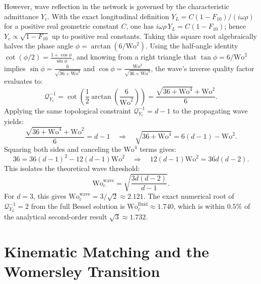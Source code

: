 \documentclass[11pt,a4paper]{article}
\theoremstyle{remark}
\begin{document}
However, wave reflection in the network is governed by the characteristic
admittance $Y_c$. With the exact longitudinal definition $Y_L =
C(1-F_{10})/(i\omega\rho)$ for a positive real geometric constant $C$, one has
$i\omega\rho\,Y_L = C(1-F_{10})$; hence $Y_c\propto\sqrt{1-F_{10}}$ up to
positive real constants. Taking this square root algebraically halves the phase
angle $\phi = \arctan(6/\mathrm{Wo}^2)$. Using the half-angle identity
$\cot(\phi/2) = \frac{1+\cos\phi}{\sin\phi}$, and knowing from a right triangle
that $\tan\phi = 6/\mathrm{Wo}^2$ implies $\sin\phi =
\frac{6}{\sqrt{36+\mathrm{Wo}^4}}$ and $\cos\phi =
\frac{\mathrm{Wo}^2}{\sqrt{36+\mathrm{Wo}^4}}$, the wave's inverse quality
factor evaluates to:
\begin{equation}
    \mathcal{Q}^{-1}_{Y_c} = \cot\left(\frac{1}{2}\arctan\left(\frac{6}{\mathrm{Wo}^2}\right)\right) = \frac{\sqrt{36 + \mathrm{Wo}^4} + \mathrm{Wo}^2}{6}.
\end{equation}
Applying the same topological constraint $\mathcal{Q}^{-1}_{Y_c} = d - 1$ to the
propagating wave yields:
\begin{equation}
    \frac{\sqrt{36+\mathrm{Wo}^4}+\mathrm{Wo}^2}{6} = d - 1 \quad\Rightarrow\quad \sqrt{36+\mathrm{Wo}^4} = 6(d-1) - \mathrm{Wo}^2.
\end{equation}
Squaring both sides and canceling the $\mathrm{Wo}^4$ terms gives:
\begin{equation}
    36 = 36(d-1)^2 - 12(d-1)\mathrm{Wo}^2 \quad\Rightarrow\quad 12(d-1)\mathrm{Wo}^2 = 36d(d-2).
\end{equation}
This isolates the theoretical wave threshold:
\begin{equation}
    \mathrm{Wo}_c^{\mathrm{wave}} = \sqrt{\frac{3d(d-2)}{d-1}}.
\end{equation}
For $d=3$, this gives $\mathrm{Wo}_c^{\mathrm{wave}} = 3/\sqrt{2} \approx
2.121$. The exact numerical root of $\mathcal{Q}^{-1}_{Y_L} = 2$ from the full
Bessel solution is $\mathrm{Wo}_c^{\mathrm{fluid}} \approx 1.740$, which is
within $0.5\%$ of the analytical second-order result $\sqrt{3} \approx 1.732$.


\section{Kinematic Matching and the Womersley Transition}
\label{sec:S2}
\end{document}
